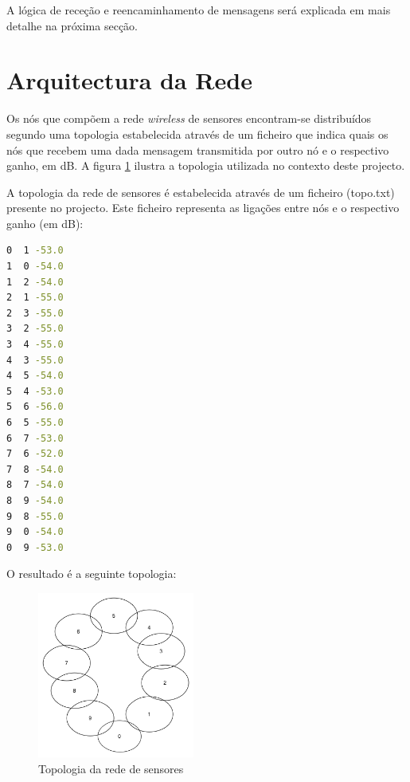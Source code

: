 \documentclass[times,10pt,twocolumn]{article}
\begin{document}
A lógica de receção e reencaminhamento de mensagens será explicada em mais detalhe na próxima secção.
	



\section{Arquitectura da Rede}
\label{sec:rede}

Os nós que compõem a rede \textit{wireless} de sensores encontram-se distribuídos segundo uma topologia estabelecida através de um ficheiro que indica quais os nós que recebem uma dada mensagem transmitida por outro nó e o respectivo ganho, em dB. A figura \ref{fig:topo} ilustra a topologia utilizada no contexto deste projecto.

A topologia da rede de sensores é estabelecida através de um ficheiro (topo.txt) presente no projecto. Este ficheiro representa as ligações entre nós e o respectivo ganho (em dB):

\begin{lstlisting}[language=bash]
0  1 -53.0
1  0 -54.0
1  2 -54.0
2  1 -55.0
2  3 -55.0
3  2 -55.0
3  4 -55.0
4  3 -55.0
4  5 -54.0
5  4 -53.0
5  6 -56.0
6  5 -55.0
6  7 -53.0
7  6 -52.0
7  8 -54.0
8  7 -54.0
8  9 -54.0
9  8 -55.0
9  0 -54.0
0  9 -53.0
\end{lstlisting}

O resultado é a seguinte topologia:

\begin{figure}[h]
	\hspace{-0.5cm}
	\includegraphics[width=0.46\textwidth]{topo.png}	
 	\caption{Topologia da rede de sensores}
	\label{fig:topo}
\end{figure}
\end{document}
